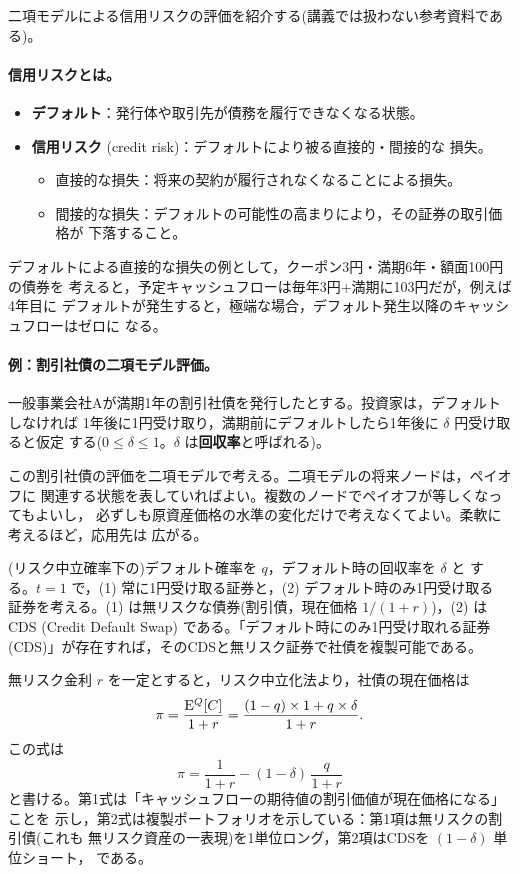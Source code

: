 二項モデルによる信用リスクの評価を紹介する(講義では扱わない参考資料である)。

\paragraph{信用リスクとは。}
\begin{itemize}
\item \textbf{デフォルト}：発行体や取引先が債務を履行できなくなる状態。
\item \textbf{信用リスク} (credit risk)：デフォルトにより被る直接的・間接的な
損失。
  \begin{itemize}
  \item 直接的な損失：将来の契約が履行されなくなることによる損失。
  \item 間接的な損失：デフォルトの可能性の高まりにより，その証券の取引価格が
  下落すること。
  \end{itemize}
\end{itemize}

デフォルトによる直接的な損失の例として，クーポン3円・満期6年・額面100円の債券を
考えると，予定キャッシュフローは毎年3円+満期に103円だが，例えば4年目に
デフォルトが発生すると，極端な場合，デフォルト発生以降のキャッシュフローはゼロに
なる。

\paragraph{例：割引社債の二項モデル評価。}
一般事業会社Aが満期1年の割引社債を発行したとする。投資家は，デフォルトしなければ
1年後に1円受け取り，満期前にデフォルトしたら1年後に $\delta$ 円受け取ると仮定
する($0\leq\delta\leq 1$。$\delta$ は\textbf{回収率}と呼ばれる)。

この割引社債の評価を二項モデルで考える。二項モデルの将来ノードは，ペイオフに
関連する状態を表していればよい。複数のノードでペイオフが等しくなってもよいし，
必ずしも原資産価格の水準の変化だけで考えなくてよい。柔軟に考えるほど，応用先は
広がる。

(リスク中立確率下の)デフォルト確率を $q$，デフォルト時の回収率を $\delta$ と
する。$t=1$ で，(1) 常に1円受け取る証券と，(2) デフォルト時のみ1円受け取る
証券を考える。(1) は無リスクな債券(割引債，現在価格 $1/(1+r)$)，(2) は
CDS (Credit Default Swap) である。「デフォルト時にのみ1円受け取れる証券
(CDS)」が存在すれば，そのCDSと無リスク証券で社債を複製可能である。

無リスク金利 $r$ を一定とすると，リスク中立化法より，社債の現在価格は
\begin{equation}
\pi = \frac{\mathrm{E}^Q[C]}{1+r} = \frac{(1-q)\times 1 + q\times\delta}{1+r}.
\end{equation}
この式は
\begin{equation}
\pi = \frac{1}{1+r} - (1-\delta)\,\frac{q}{1+r}
\end{equation}
と書ける。第1式は「キャッシュフローの期待値の割引価値が現在価格になる」ことを
示し，第2式は複製ポートフォリオを示している：第1項は無リスクの割引債(これも
無リスク資産の一表現)を1単位ロング，第2項はCDSを $(1-\delta)$ 単位ショート，
である。

